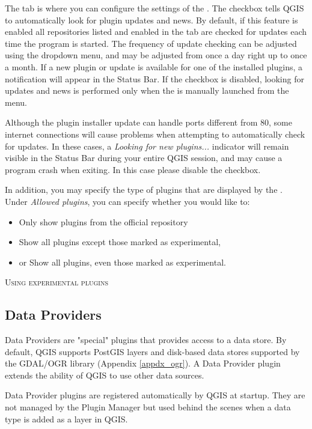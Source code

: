 
The  tab is where you can configure the settings of the . The  checkbox tells QGIS to automatically look for plugin updates and news. By default, if this feature is enabled all repositories listed and enabled in the  tab are checked for updates each time the program is started. The frequency of update checking can be adjusted using the dropdown menu, and may be adjusted from once a day right up to once a month. If a new plugin or update is available for one of the installed plugins, a notification will appear in the Status Bar. If the checkbox is disabled, looking for updates and news is performed only when the  is manually launched from the menu.

Although the plugin installer update can handle ports different from 80, some internet 
connections will cause problems when attempting to automatically check for updates. 
In these cases, a \textit{Looking for new plugins...} indicator will 
remain visible in the Status Bar during your entire QGIS session, and may cause a 
program crash when exiting. In this case please disable the checkbox.

In addition, you may specify the type of plugins that are displayed by the . Under \textit{Allowed plugins}, you can specify whether you would like to:

\begin{itemize}
\item Only show plugins from the official repository
\item Show all plugins except those marked as experimental,
\item or Show all plugins, even those marked as experimental.
\end{itemize}

\begin{Tip}
 \caption{\textsc{Using experimental plugins}}
\end{Tip}


\subsection{Data Providers}

Data Providers are "special" plugins that provides access to a data store.
By default, QGIS supports PostGIS layers and disk-based data stores supported by the GDAL/OGR library (Appendix \ref{appdx_ogr}).
A Data Provider plugin extends the ability of QGIS to use other data sources.

Data Provider plugins are registered automatically by QGIS at startup.
They are not managed by the Plugin Manager but used behind the scenes when a data type is added as a layer in QGIS.
